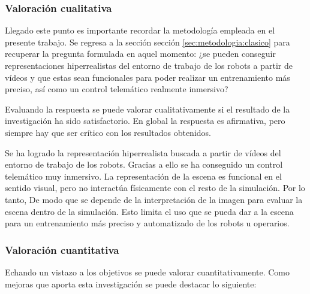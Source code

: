 \documentclass[a4paper, 12pt, spanish, twoside]{article}
\begin{document}
\subsubsection{Valoración cualitativa} \label{sec:resultados-y-discusion:discusion:cualitativa}

Llegado este punto es importante recordar la metodología empleada en el presente trabajo. Se regresa a la sección sección \ref{sec:metodologia:clasico} para recuperar la pregunta formulada en aquel momento: ¿se pueden conseguir representaciones hiperrealistas del entorno de trabajo de los robots a partir de vídeos y que estas sean funcionales para poder realizar un entrenamiento más preciso, así como un control telemático realmente inmersivo? 

Evaluando la respuesta se puede valorar cualitativamente si el resultado de la investigación ha sido satisfactorio. En global la respuesta es afirmativa, pero siempre hay que ser crítico con los resultados obtenidos. 

Se ha logrado la representación hiperrealista buscada a partir de vídeos del entorno de trabajo de los robots. Gracias a ello se ha conseguido un control telemático muy inmersivo. La representación de la escena es funcional en el sentido visual, pero no interactúa físicamente con el resto de la simulación. Por lo tanto, De modo que se depende de la interpretación de la imagen para evaluar la escena dentro de la simulación. Esto limita el uso que se pueda dar a la escena para un entrenamiento más preciso y automatizado de los robots u operarios. 

\subsubsection{Valoración cuantitativa} \label{sec:resultados-y-discusion:discusion:cuantitativa}

Echando un vistazo a los objetivos se puede valorar cuantitativamente. Como mejoras que aporta esta investigación se puede destacar lo siguiente:  
\end{document}
